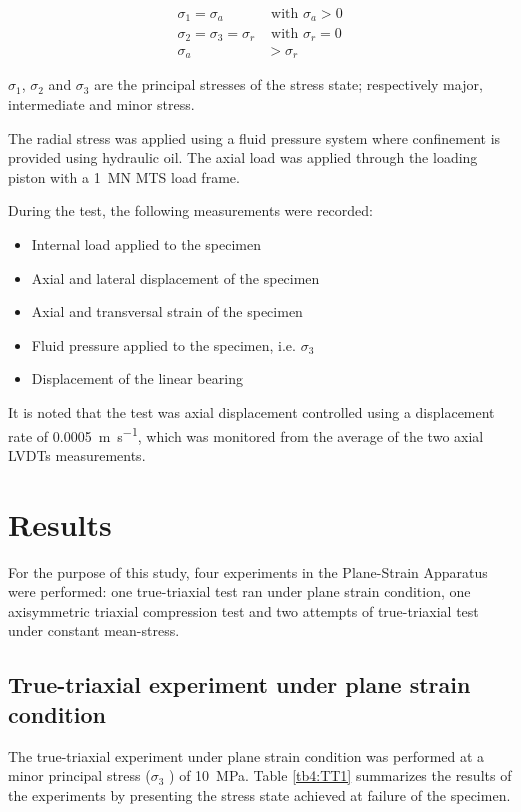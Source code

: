 \begin{align}
    \sigma_1 = \sigma_a &\text{ with } \sigma_a > 0 \\
    \sigma_2 = \sigma_3 = \sigma_r  &\text{ with } \sigma_r = 0 \\
    \sigma_a &> \sigma_r
\end{align}

$\sigma_1$, $\sigma_2$  and  $\sigma_3$  are the principal stresses of the stress state; respectively major, intermediate and minor stress.

The radial stress was applied using a fluid pressure system where confinement is provided using hydraulic oil. The axial load was applied through the loading piston with a \SI{1}{MN} MTS load frame. 

During the test, the following measurements were recorded: 

\begin{itemize}
    \item Internal load applied to the specimen 
    \item Axial and lateral displacement of the specimen 
    \item Axial and transversal strain of the specimen
    \item Fluid pressure applied to the specimen, i.e. $\sigma_3$
    \item Displacement of the linear bearing
\end{itemize}

It is noted that the test was axial displacement controlled using a displacement rate of \SI{0.0005}{\meter\per\second}, which was monitored from the average of the two axial LVDTs measurements. 

\section{Results}

For the purpose of this study, four experiments in the Plane-Strain Apparatus were performed: one true-triaxial test ran under plane strain condition, one axisymmetric triaxial compression test and two attempts of true-triaxial test under constant mean-stress. 

\subsection{True-triaxial experiment under plane strain condition}

The true-triaxial experiment under plane strain condition was performed at a minor principal stress ($\sigma_3$ ) of \SI{10}{MPa}. Table \ref{tb4:TT1} summarizes the results of the experiments by presenting the stress state achieved at failure of the specimen.

